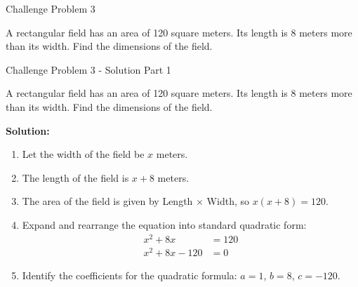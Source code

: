 \documentclass[aspectratio=169]{beamer}
\begin{document}
\begin{frame}{Challenge Problem 3}
    \begin{tcolorbox}[colback=lightgray,colframe=primary,title=Problem]
        \footnotesize
        A rectangular field has an area of 120 square meters. Its length is 8 meters more than its width. Find the dimensions of the field.
    \end{tcolorbox}
\end{frame}

\begin{frame}{Challenge Problem 3 - Solution Part 1}
    \begin{tcolorbox}[colback=lightgray,colframe=accent,title=Detailed Solution (Part 1)]
        \footnotesize
        A rectangular field has an area of 120 square meters. Its length is 8 meters more than its width. Find the dimensions of the field.
        
        \textbf{Solution:}
        \begin{enumerate}
            \setlength{\itemsep}{0.5em}
            \item Let the width of the field be $x$ meters.
            \item The length of the field is $x + 8$ meters.
            \item The area of the field is given by Length $\times$ Width, so $x(x + 8) = 120$.
            \item Expand and rearrange the equation into standard quadratic form:
            \begin{align*}
                x^2 + 8x &= 120 \\
                x^2 + 8x - 120 &= 0
            \end{align*}
            \item Identify the coefficients for the quadratic formula: $a=1$, $b=8$, $c=-120$.
        \end{enumerate}
    \end{tcolorbox}
\end{frame}
\end{document}
